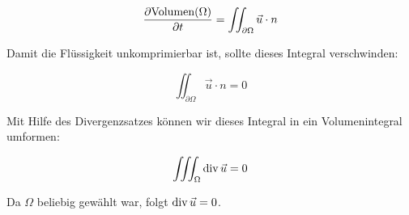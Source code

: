 \begin{equation}
\frac{
	\partial \textnormal{Volumen}(\Omega)
}
{
	\partial t
}
=
\iint_{\partial \Omega} \vec{u} \cdot n
\end{equation}

Damit die Flüssigkeit unkomprimierbar ist, sollte dieses Integral verschwinden:

\begin{equation}
\iint_{\partial \Omega} \vec{u} \cdot n = 0
\end{equation}

Mit Hilfe des Divergenzsatzes können wir dieses Integral in ein Volumenintegral
umformen:

\begin{equation}
\iiint_\Omega \operatorname*{div} \vec{u} = 0
\end{equation}

Da $\Omega$ beliebig gewählt war, folgt $\operatorname*{div} \vec{u} = 0$.


